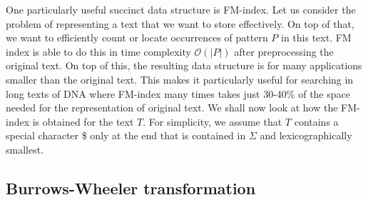 One particularly useful succinct data structure is FM-index. Let us consider the
problem of representing a text that we want to store effectively. On top of that,
we want to efficiently count or locate occurrences of pattern $P$ in this text.
FM index is able to do this in time complexity $\mathcal{O}(|P|)$ after preprocessing the
original text. On top of this, the resulting data structure is for many applications
smaller than the original text. This makes it particularly useful for searching in
long texts of DNA where FM-index many times takes just 30-40\% of the space needed
for the representation of original text. We shall now look at how the FM-index
is obtained for the text $T$. For simplicity, we assume that $T$ contains a special
character \$ only at the end that is contained in $\Sigma$ and lexicographically smallest.

\subsection{Burrows-Wheeler transformation}

